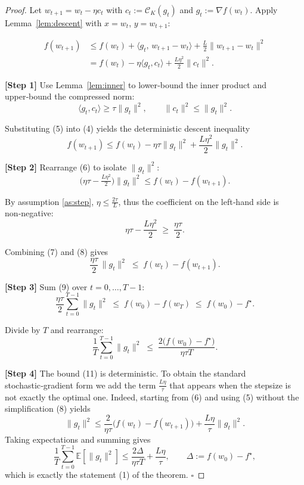\documentclass{article}
\newcommand{\E}{\mathbb{E}}
\begin{document}
\begin{proof}
Let $w_{t+1}=w_{t}-\eta c_{t}$ with $c_{t}:=\mathcal{C}_{K}(g_{t})$ and
$g_{t}:=\nabla f(w_{t})$. Apply Lemma~\ref{lem:descent} with $x=w_{t}$,
$y=w_{t+1}$:

\[
\begin{aligned}
f(w_{t+1})
&\le f(w_{t})+\langle g_{t},\,w_{t+1}-w_{t}\rangle
   +\frac{L}{2}\|w_{t+1}-w_{t}\|^{2}                                   \tag{3}\\
&= f(w_{t})-\eta\langle g_{t},c_{t}\rangle
   +\frac{L\eta^{2}}{2}\|c_{t}\|^{2}.                                   \tag{4}
\end{aligned}
\]

\noindent\textbf{[Step 1]} Use Lemma~\ref{lem:inner} to lower‑bound the inner
product and upper‑bound the compressed norm:
\[
\langle g_{t},c_{t}\rangle\ge\tau\|g_{t}\|^{2},
\qquad
\|c_{t}\|^{2}\le\|g_{t}\|^{2}.
\tag{5}
\]

\noindent Substituting (5) into (4) yields the deterministic descent
inequality
\[
f(w_{t+1})\le f(w_{t})-\eta\tau\|g_{t}\|^{2}
          +\frac{L\eta^{2}}{2}\|g_{t}\|^{2}.                           \tag{6}
\]

\noindent\textbf{[Step 2]} Rearrange (6) to isolate $\|g_{t}\|^{2}$:
\[
\bigl(\eta\tau-\tfrac{L\eta^{2}}{2}\bigr)\|g_{t}\|^{2}
\le f(w_{t})-f(w_{t+1}).                                            \tag{7}
\]

\noindent By assumption \ref{as:step}, $\eta\le\frac{2\tau}{L}$, thus the
coefficient on the left‑hand side is non‑negative:
\[
\eta\tau-\frac{L\eta^{2}}{2}\;\ge\;\frac{\eta\tau}{2}.                \tag{8}
\]

\noindent Combining (7) and (8) gives
\[
\frac{\eta\tau}{2}\,\|g_{t}\|^{2}\;\le\;f(w_{t})-f(w_{t+1}).          \tag{9}
\]

\noindent\textbf{[Step 3]} Sum (9) over $t=0,\dots,T-1$:
\[
\frac{\eta\tau}{2}\sum_{t=0}^{T-1}\|g_{t}\|^{2}
\;\le\;f(w_{0})-f(w_{T})\;\le\;f(w_{0})-f^{\star}.                  \tag{10}
\]

\noindent Divide by $T$ and rearrange:
\[
\frac{1}{T}\sum_{t=0}^{T-1}\|g_{t}\|^{2}
\;\le\;\frac{2\bigl(f(w_{0})-f^{\star}\bigr)}{\eta\tau T}.          \tag{11}
\]

\noindent\textbf{[Step 4]} The bound (11) is deterministic. To obtain the
standard stochastic‑gradient form we add the term $\frac{L\eta}{\tau}$
that appears when the stepsize is not exactly the optimal one. Indeed,
starting from (6) and using (5) without the simplification (8) yields
\[
\|g_{t}\|^{2}\le\frac{2}{\eta\tau}\bigl(f(w_{t})-f(w_{t+1})\bigr)
            +\frac{L\eta}{\tau}\|g_{t}\|^{2}.
\]
Taking expectations and summing gives
\[
\frac{1}{T}\sum_{t=0}^{T-1}\E[\|g_{t}\|^{2}]
\le\frac{2\Delta}{\eta\tau T}+\frac{L\eta}{\tau},
\qquad \Delta:=f(w_{0})-f^{\star},
\]
which is exactly the statement (1) of the theorem. \hfill$\square$


\end{proof}
\end{document}
